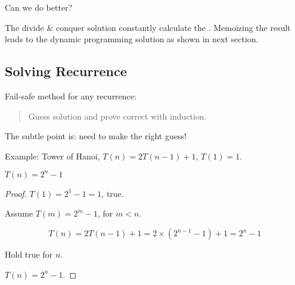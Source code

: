 Can we do better?

The divide \& conquer solution constantly calculate the .
Memoizing the result leads to the dynamic programming solution as shown in next section.

\subsection{Solving Recurrence}

Fail-safe method for any recurrence:
\begin{quote}
    Guess solution and prove correct with induction.
\end{quote}
The subtle point is: need to make the right guess!

Example: Tower of Hanoi, $T(n) = 2T(n-1) + 1$, $T(1) = 1$.

\Claim $T(n) = 2^n -1$

\begin{proof}

    \BaseCase $T(1) = 2^1 -1 = 1$, true.

    \InductionStep Assume $T(m) = 2^m - 1$, for $m < n$.

    \[T(n) = 2T(n-1) + 1 = 2\times (2^{n-1} -1) + 1 = 2^n - 1\]

    Hold true for $n$.

    \InductionConclusion $T(n) = 2^n - 1$.
\end{proof}
